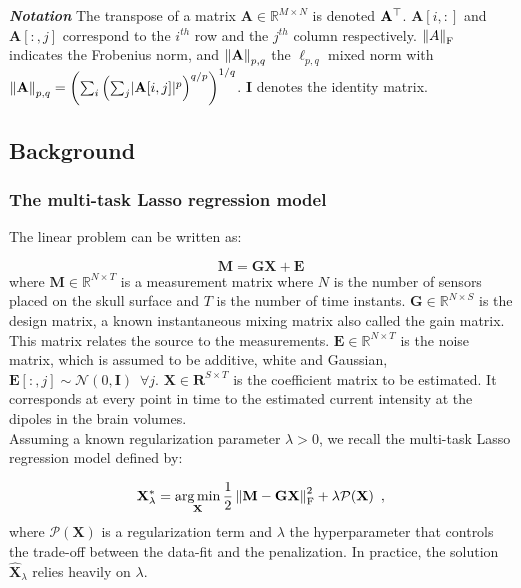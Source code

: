 \textit{\textbf{Notation}} The transpose of a matrix $\mathbf{A} \in \mathbb{R}^{M \times N}$ is
denoted $\bf{A}^\top$. $\mathbf{A}[i,:]$ and $\mathbf{A}[:,j]$ correspond to the $i^{th}$
row and the $j^{th}$ column respectively. $\left \lVert A \right \rVert_{\text{F}}$ indicates the Frobenius norm,
and $\left \lVert \mathbf{A} \right \rVert_{p,q}$ the $\ell_{p,q}$ mixed norm with $\left \lVert \mathbf{A} \right \rVert_{p,q} 
= \left(\sum_i \left(\sum_j \lvert \mathbf{A}[i,j] \rvert^p\right)^{q/p}\right)^{1/q}$.
$\mathbf{I}$ denotes the identity matrix.


\subsection{Background}
\label{sub:background}
%

\subsubsection{The multi-task Lasso regression model}

The linear problem can be written as:

\begin{equation}
    \mathbf{M = GX + E} 
\end{equation}
%
where $\mathbf{M} \in \mathbb{R}^{N \times T}$ is a measurement matrix where $N$ is the
number of sensors placed on the skull surface and $T$ is the number of time instants.
$\mathbf{G} \in \mathbb{R}^{N \times S}$ is the design matrix, a known 
instantaneous mixing matrix also called the gain matrix. This matrix relates the source
to the measurements. $\mathbf{E} \in \mathbb{R}^{N \times T}$ is the noise matrix, which
is assumed to be additive, white and Gaussian, $\mathbf{E}[:,j] \sim \mathcal{N}(0, \mathbf{I})
\enspace \forall j$. $\mathbf{X} \in \mathbf{R}^{S \times T}$ is the coefficient matrix to be estimated. 
It corresponds at every point in time to the estimated current intensity at the dipoles in
the brain volumes.
\\
Assuming a known regularization parameter $\lambda > 0$, we recall the multi-task
Lasso regression model defined by:

\begin{equation}
    \mathbf{X}_{\lambda}^* = \operatorname*{arg\,min}_{\mathbf{X}}
    \frac{1}{2}\left \lVert \mathbf{M - GX} \right \rVert^2_{\text{F}}
    + \lambda \mathcal{P}(\mathbf{X})
    \enspace ,
\end{equation}
%
where $\mathcal{P}(\mathbf{X})$ is a regularization term and $\lambda$ the hyperparameter
that controls the trade-off between the data-fit and the penalization. In practice, the solution
$\hat{\mathbf{X}}_{\lambda}$ relies heavily on $\lambda$.

